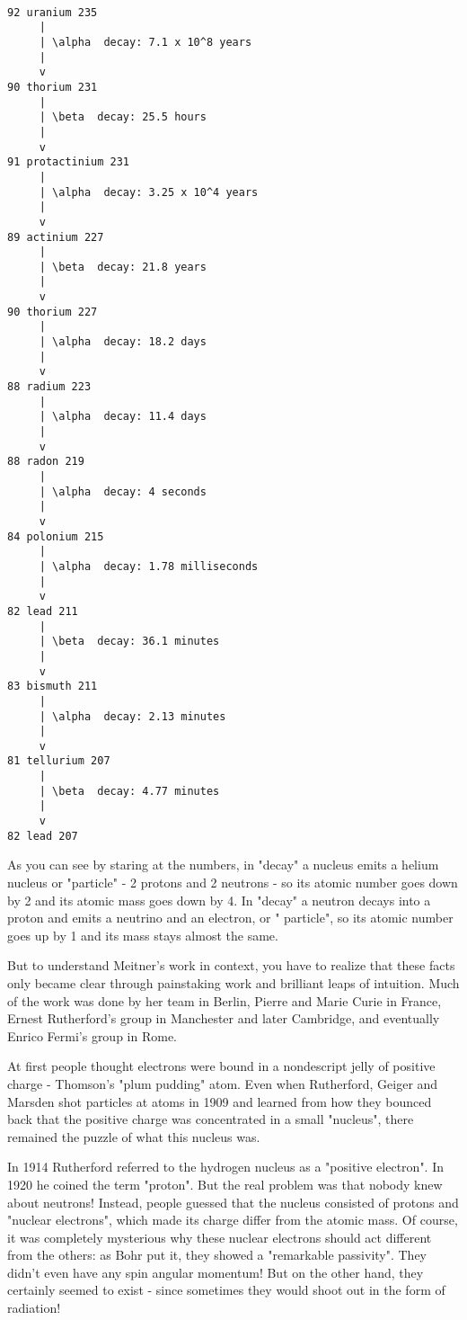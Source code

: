 \begin{verbatim}

92 uranium 235    
     |
     | \alpha  decay: 7.1 x 10^8 years    
     |
     v
90 thorium 231 
     |
     | \beta  decay: 25.5 hours             
     |                                  
     v
91 protactinium 231                       
     |                                
     | \alpha  decay: 3.25 x 10^4 years 
     |
     v
89 actinium 227
     |
     | \beta  decay: 21.8 years
     |
     v
90 thorium 227
     |
     | \alpha  decay: 18.2 days
     |
     v
88 radium 223 
     |
     | \alpha  decay: 11.4 days
     |
     v
88 radon 219
     |
     | \alpha  decay: 4 seconds 
     |
     v
84 polonium 215
     |
     | \alpha  decay: 1.78 milliseconds
     |
     v
82 lead 211
     |
     | \beta  decay: 36.1 minutes
     |
     v
83 bismuth 211 
     |
     | \alpha  decay: 2.13 minutes
     |
     v
81 tellurium 207
     |
     | \beta  decay: 4.77 minutes
     |
     v
82 lead 207 

\end{verbatim}
    
As you can see by staring at the numbers, in "\alpha  decay" a
nucleus emits a helium nucleus or "\alpha  particle" - 2 protons
and 2 neutrons - so its atomic number goes down by 2 and its atomic mass
goes down by 4.  In "\beta  decay" a neutron decays into a
proton and emits a neutrino and an electron, or "\beta 
particle", so its atomic number goes up by 1 and its mass stays
almost the same.

But to understand Meitner's work in context, you have to realize that
these facts only became clear through painstaking work and brilliant
leaps of intuition.  Much of the work was done by her team in Berlin,
Pierre and Marie Curie in France, Ernest Rutherford's group in
Manchester and later Cambridge, and eventually Enrico Fermi's group in
Rome.


At first people thought electrons were bound in a nondescript jelly of
positive charge - Thomson's "plum pudding" atom.  Even when
Rutherford, Geiger and Marsden shot \alpha  particles at atoms in 1909 and
learned from how they bounced back that the positive charge was
concentrated in a small "nucleus", there remained the puzzle
of what this nucleus was.


In 1914 Rutherford referred to the hydrogen nucleus as a "positive
electron".  In 1920 he coined the term "proton".  But the
real problem was that nobody knew about neutrons!  Instead, people
guessed that the nucleus consisted of protons and "nuclear
electrons", which made its charge differ from the atomic mass.  Of
course, it was completely mysterious why these nuclear electrons should
act different from the others: as Bohr put it, they showed a
"remarkable passivity".  They didn't even have any spin
angular momentum!  But on the other hand, they certainly seemed to exist
- since sometimes they would shoot out in the form of \beta  radiation!

